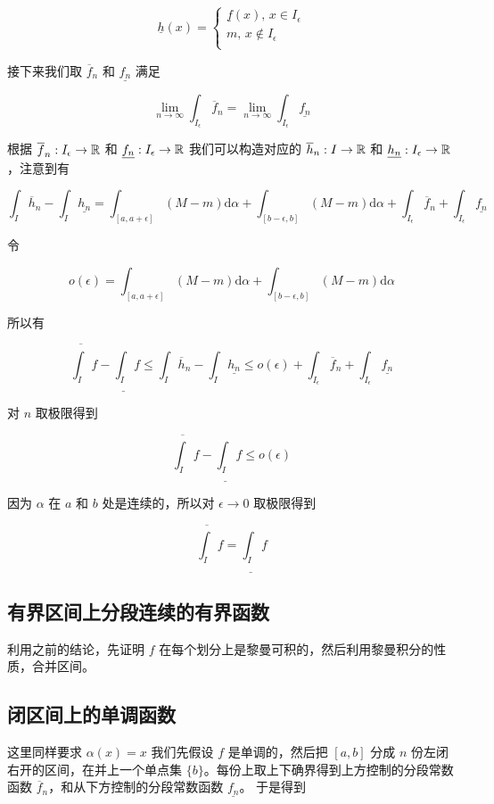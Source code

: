 \[
\underline{h}(x) = \begin{cases}
    \underline{f}(x),\, x \in I_{\epsilon} \\
    m,\, x \notin I_{\epsilon} \\
\end{cases}
\]

接下来我们取 $\overline{f}_n$ 和 $\underline{f_n}$ 满足

\[
\lim_{n \to \infty}\int_{I_\epsilon}\overline{f}_n = \lim_{n \to \infty}\int_{I_\epsilon}\underline{f_n}
\]

根据 $\overline{f}_n: I_\epsilon \to \mathbb{R}$ 和 $\underline{f_n}: I_\epsilon \to \mathbb{R}$ 我们可以构造对应的 $\overline{h}_n: I \to \mathbb{R}$
和 $\underline{h_n}: I_\epsilon \to \mathbb{R}$，注意到有

\[
\int_{I}\overline{h}_n - \int_{I}\underline{h_n} = \int_{[a,a+\epsilon]}(M-m)\mathrm{d}\alpha + \int_{[b-\epsilon,b]}(M-m)\mathrm{d}\alpha + \int_{I_\epsilon}\overline{f}_n + \int_{I_\epsilon}\underline{f_n}
\]

令 

\[
o(\epsilon) = \int_{[a,a+\epsilon]}(M-m)\mathrm{d}\alpha + \int_{[b-\epsilon,b]}(M-m)\mathrm{d}\alpha
\]

所以有

\[
\overline{\int_{I}}f - \underline{\int_{I}}f \le \int_{I}\overline{h}_n - \int_{I}\underline{h_n} \le o(\epsilon)  + \int_{I_\epsilon}\overline{f}_n + \int_{I_\epsilon}\underline{f_n}
\]

对 $n$ 取极限得到

\[
\overline{\int_{I}}f - \underline{\int_{I}}f \le  o(\epsilon)
\]

因为 $\alpha$ 在 $a$ 和 $b$ 处是连续的，所以对 $\epsilon \to 0$ 取极限得到

\[
\overline{\int_{I}}f = \underline{\int_{I}}f
\]

\subsection{有界区间上分段连续的有界函数}

利用之前的结论，先证明 $f$ 在每个划分上是黎曼可积的，然后利用黎曼积分的性质，合并区间。

\subsection{闭区间上的单调函数}

这里同样要求 $\alpha(x) = x$
我们先假设 $f$ 是单调的，然后把 $[a,b]$ 分成 $n$ 份左闭右开的区间，在并上一个单点集 $\{b\}$。每份上取上下确界得到上方控制的分段常数函数 $\overline{f}_n$，和从下方控制的分段常数函数 $\underline{f_n}$。
于是得到


